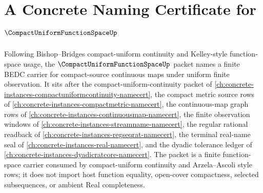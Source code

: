 \chapter{A Concrete Naming Certificate for $\CompactUniformFunctionSpaceUp$}
\label{ch:concrete-instances-compact-uniform-function-space-namecert}

Following Bishop--Bridges compact-uniform continuity and Kelley-style function-space usage, the $\CompactUniformFunctionSpaceUp$ packet names a finite BEDC carrier for compact-source continuous maps under uniform finite observation. It sits after the compact-uniform-continuity packet of \autoref{ch:concrete-instances-compactuniformcontinuity-namecert}, the compact metric source rows of \autoref{ch:concrete-instances-compactmetric-namecert}, the continuous-map graph rows of \autoref{ch:concrete-instances-continuousmap-namecert}, the finite observation windows of \autoref{ch:concrete-instances-streamname-namecert}, the regular rational readback of \autoref{ch:concrete-instances-regseqrat-namecert}, the terminal real-name seal of \autoref{ch:concrete-instances-real-namecert}, and the dyadic tolerance ledger of \autoref{ch:concrete-instances-dyadicratcore-namecert}. The packet is a finite function-space carrier consumed by compact-uniform continuity and Arzela--Ascoli style rows; it does not import host function equality, open-cover compactness, selected subsequences, or ambient Real completeness.

